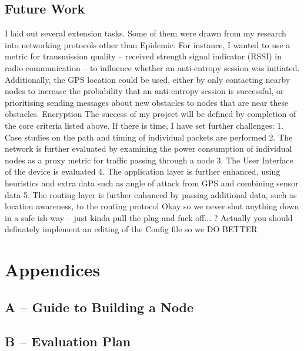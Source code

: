 \documentclass[12pt,a4paper]{report}
\begin{document}
\section{Future Work}
I laid out several extension tasks. Some of them were drawn from my research into networking protocols other than Epidemic. For instance, I wanted to use a metric for transmission quality -- received strength signal indicator (RSSI) in radio communication -- to influence whether an anti-entropy session was initiated. Additionally, the GPS location could be used, either by only contacting nearby nodes to increase the probability that an anti-entropy session is successful, or prioritising sending messages about new obstacles to nodes that are near these obstacles. 
Encryption 
The success of my project will be defined by completion of the core criteria listed above. If there is
time, I have set further challenges:
1. Case studies on the path and timing of individual packets are performed
2. The network is further evaluated by examining the power consumption of individual nodes as
a proxy metric for traffic passing through a node
3. The User Interface of the device is evaluated
4. The application layer is further enhanced, using heuristics and extra data such as angle of
attack from GPS and combining sensor data
5. The routing layer is further enhanced by passing additional data, such as location awareness,
to the routing protocol
Okay so we never shut anything down in a safe ish way -- just kinda pull the plug and fuck off... ? Actually you should definately implement an editing of the Config file so we DO BETTER


%


\chapter*{Appendices}

\section*{A -- Guide to Building a Node}
\label{appendixA}
\setcounter{chapter}{0}
\setcounter{figure}{0}

\newpage
\section*{B -- Evaluation Plan}
\label{appendixB}
\setcounter{figure}{0}

\end{document}
